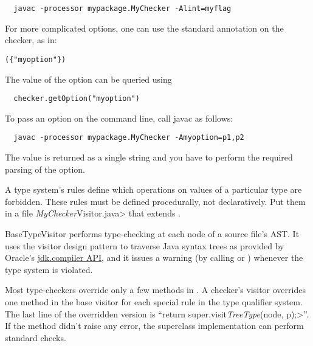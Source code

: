 \begin{Verbatim}
  javac -processor mypackage.MyChecker -Alint=myflag
\end{Verbatim}



For more complicated options, one can use the standard
 annotation on the checker, as in:

\begin{alltt}
  (\{"myoption"\})
\end{alltt}

The value of the option can be queried using

\begin{Verbatim}
  checker.getOption("myoption")
\end{Verbatim}

To pass an option on the command line, call javac as follows:

\begin{Verbatim}
  javac -processor mypackage.MyChecker -Amyoption=p1,p2
\end{Verbatim}

The value is returned as a single string and you have to perform the
required parsing of the option.





A type system's rules define which operations on values of a
particular type are forbidden.
These rules must be defined procedurally, not declaratively.
Put them in a file \<\emph{MyChecker}Visitor.java> that extends
.

BaseTypeVisitor performs type-checking at each node of a
source file's AST\@.  It uses the visitor design pattern to traverse
Java syntax trees as provided by Oracle's
\href{https://docs.oracle.com/en/java/javase/11/docs/api/jdk.compiler/module-summary.html}{jdk.compiler
API},
and it issues a warning (by calling
or
)
whenever the type system is violated.

Most type-checkers
override only a few methods in .
A checker's visitor overrides one method in the base visitor for each special
rule in the type qualifier system.
The last line of the overridden version is
``\<return super.visit\emph{TreeType}(node, p);>''.
If the method didn't raise any error,
the superclass implementation can perform standard checks.



